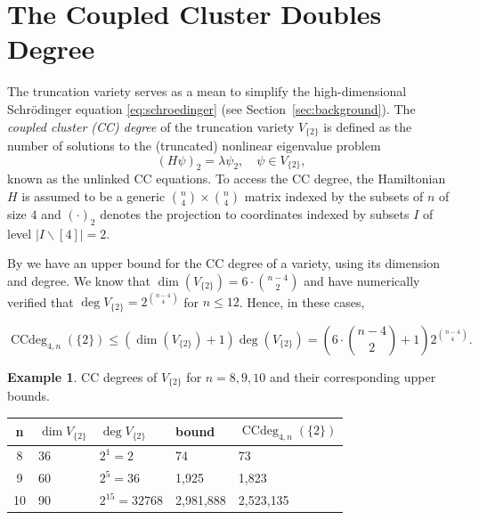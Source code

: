 \documentclass[11pt,reqno]{amsart}
\theoremstyle{definition}
\newtheorem{example}[theorem]{Example}
\numberwithin{theorem}{section}
\newcommand{\CCdeg}{\operatorname{CCdeg}}
\numberwithin{equation}{section}
\begin{document}
\section{The Coupled Cluster Doubles Degree}\label{sec:ccd}

The truncation variety serves as a mean to simplify the high-dimensional Schrödinger equation \eqref{eq:schroedinger} (see Section~\ref{sec:background}). The \emph{coupled cluster (CC) degree} of the truncation variety $V_{\{2\}}$ is defined as the number of solutions to the (truncated) nonlinear eigenvalue problem
\begin{equation}
\label{eq:CCeq}
    (H\psi)_2 = \lambda\psi_2, \quad \psi \in V_{\{2\}},
\end{equation}
known as the unlinked CC equations. To access the CC degree, the Hamiltonian $H$ is assumed to be a generic $\binom{n}{4} \times \binom{n}{4}$ matrix indexed by the subsets of $n$ of size $4$ and $(\cdot)_2$ denotes the projection to coordinates indexed by subsets $I$ of level $|I \backslash [4]| = 2$. 

By \cite[Theorem~5.2]{faulstich2024algebraic} we have an upper bound for the CC degree of a variety, using its dimension and degree. We know that $\dim( V_{\{2\}})= 6 \cdot \binom{n - 4}{2}$ and have numerically verified that $\deg V_{\{2\}} = 2^{n-4 \choose 4}$ for $n \leq 12$.
Hence, in these cases,

\begin{equation}\label{eq:bound}
    \operatorname{CCdeg}_{4,n}(\{2\}) \le (\dim( V_{\{2\}}) + 1)\deg(V_{\{2\}}) = \left( 6 \cdot \binom{n - 4}{2} +1 \right) 2^{n-4 \choose 4}.
\end{equation}



\begin{example}
\label{ex: CC bound}
CC degrees of $V_{\{2\}}$ for $n = 8,9,10$ and their corresponding upper bounds.

\begin{center}
    \begin{tabular}{c|l|l|l|l}
    \toprule
         n & $\dim V_{\{2\}}$ & $\deg V_{\{2\}}$ & bound & $\CCdeg_{4,n}(\{2\})$  \\
    \midrule
         8 & 36 & $2^1=2$ & 74 & 73 \\
        9 & 60 & $2^5=36$ & 1{,}925 & 1{,}823 \\
        10 & 90 & $2^{15}=32768$ & 2{,}981{,}888 & 2{,}523{,}135 \\
    \bottomrule
    \end{tabular}
\end{center}

\end{example}
\end{document}
